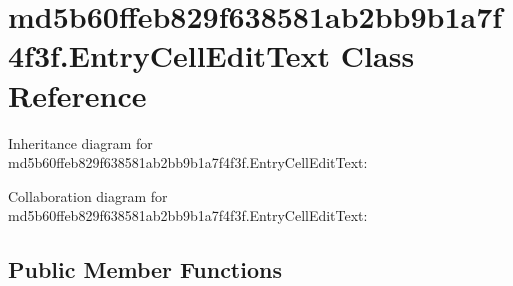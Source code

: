 \hypertarget{classmd5b60ffeb829f638581ab2bb9b1a7f4f3f_1_1_entry_cell_edit_text}{}\section{md5b60ffeb829f638581ab2bb9b1a7f4f3f.\+Entry\+Cell\+Edit\+Text Class Reference}
\label{classmd5b60ffeb829f638581ab2bb9b1a7f4f3f_1_1_entry_cell_edit_text}


Inheritance diagram for md5b60ffeb829f638581ab2bb9b1a7f4f3f.\+Entry\+Cell\+Edit\+Text\+:


Collaboration diagram for md5b60ffeb829f638581ab2bb9b1a7f4f3f.\+Entry\+Cell\+Edit\+Text\+:
\subsection*{Public Member Functions}
